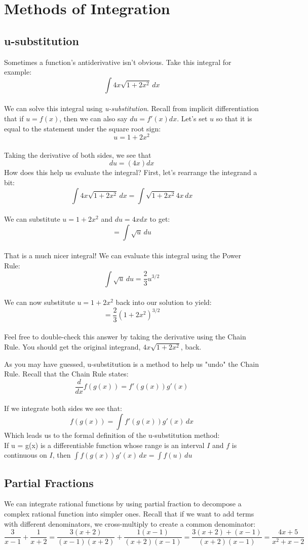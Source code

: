 \chapter{Methods of Integration}

\section{u-substitution}
Sometimes a function's antiderivative isn't obvious. Take this 
integral for example: $$\int 4x \sqrt{1 + 2x^2}\, dx$$\\ We can solve 
this integral using \textit{u-substitution}. Recall from implicit 
differentiation that if $u = f(x)$, then we can also say $du = 
f'(x) dx$. Let's set $u$ so that it is equal to the statement under 
the square root sign: $$u = 1 + 2x^2$$\\ Taking the derivative of both 
sides, we see that $$du = (4x) dx$$ How does this help us evaluate 
the integral? First, let's rearrange the integrand a bit: $$\int 4x 
\sqrt{1 + 2x^2}\,dx = \int \sqrt{1 + 2x^2} 4x\,dx$$\\ We can substitute 
$u = 1 + 2x^2$ and $du = 4x dx$ to get: $$= \int \sqrt{u}\,du$$\\ That 
is a much nicer integral! We can evaluate this integral using the 
Power Rule: $$\int \sqrt{u}\,du = \frac{2}{3}u^{3/2}$$\\ We can now 
substitute $u = 1 + 2x^2$ back into our solution to yield: $$= 
\frac{2}{3}(1 + 2x^2)^{3/2}$$\\ Feel free to double-check this answer 
by taking the derivative using the Chain Rule. You should get the 
original integrand, $4x \sqrt{1 + 2x^2}$, back. 

As you may have guessed, u-substitution is a method to help us "undo" 
the Chain Rule. Recall that the Chain Rule states: $$\frac{d}{dx}
f(g(x)) = f'(g(x))g'(x)$$\\ If we integrate both sides we see that: 
$$f(g(x)) = \int f'(g(x))g'(x)\,dx$$ Which leads us to the formal 
definition of the u-substitution method:\\

If u = g(x) is a differentiable function whose range is an interval 
$I$ and $f$ is continuous on $I$, then $\int f(g(x))g'(x)\,dx = \int 
f(u)\,du$

\section{Partial Fractions}
We can integrate rational functions by using partial fraction to decompose a 
complex rational function into simpler ones. Recall that if we want to add 
terms with different denominators, we cross-multiply to create a common 
denominator:
$$\frac{3}{x - 1} + \frac{1}{x + 2} = \frac{3 (x + 2) }{(x - 1) (x + 2)} + 
\frac{1 (x - 1) }{(x + 2) (x - 1)} = \frac{3 (x + 2) + (x - 1)}{(x + 2) (x - 1)} 
= \frac{4x + 5}{x^2 + x - 2}$$

